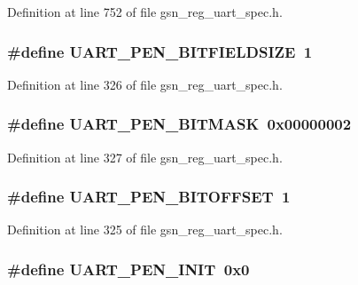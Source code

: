 Definition at line 752 of file gsn\_\-reg\_\-uart\_\-spec.h.

\hypertarget{a00575_a877db9be97b34a48954e5e744eba29f5}{
\subsubsection[{UART\_\-PEN\_\-BITFIELDSIZE}]{\setlength{\rightskip}{0pt plus 5cm}\#define UART\_\-PEN\_\-BITFIELDSIZE~1}}
\label{a00575_a877db9be97b34a48954e5e744eba29f5}


Definition at line 326 of file gsn\_\-reg\_\-uart\_\-spec.h.

\hypertarget{a00575_aa8450284897f7ffe0a9b48131830d36e}{
\subsubsection[{UART\_\-PEN\_\-BITMASK}]{\setlength{\rightskip}{0pt plus 5cm}\#define UART\_\-PEN\_\-BITMASK~0x00000002}}
\label{a00575_aa8450284897f7ffe0a9b48131830d36e}


Definition at line 327 of file gsn\_\-reg\_\-uart\_\-spec.h.

\hypertarget{a00575_a7767f9caf706ad14f54e580db6fc84c4}{
\subsubsection[{UART\_\-PEN\_\-BITOFFSET}]{\setlength{\rightskip}{0pt plus 5cm}\#define UART\_\-PEN\_\-BITOFFSET~1}}
\label{a00575_a7767f9caf706ad14f54e580db6fc84c4}


Definition at line 325 of file gsn\_\-reg\_\-uart\_\-spec.h.

\hypertarget{a00575_a88d5c65125b2d9d3206a69a9ab7965df}{
\subsubsection[{UART\_\-PEN\_\-INIT}]{\setlength{\rightskip}{0pt plus 5cm}\#define UART\_\-PEN\_\-INIT~0x0}}
\label{a00575_a88d5c65125b2d9d3206a69a9ab7965df}


